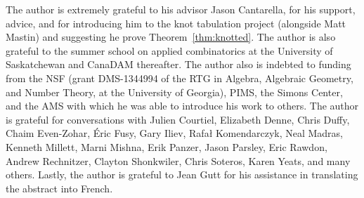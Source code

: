 \documentclass[submission%
]{dmtcs}
\begin{document}
The author is extremely grateful to his advisor Jason Cantarella, for
his support, advice, and for introducing him to the knot tabulation project
(alongside Matt Mastin) and suggesting he prove
Theorem~\ref{thm:knotted}. The author is also grateful to the summer
school on applied combinatorics at the University of Saskatchewan and
CanaDAM thereafter. The author also is indebted to funding from the NSF
(grant DMS-1344994 of the RTG in Algebra, Algebraic Geometry, and
Number Theory, at the University of Georgia), PIMS, the Simons Center,
and the AMS with which he was able to introduce his work to
others. The author is grateful for conversations with Julien Courtiel,
Elizabeth Denne, Chris Duffy, Chaim Even-Zohar, \'Eric Fusy, Gary
Iliev, Rafa\l{} Komendarczyk, Neal Madras, Kenneth Millett, Marni
Mishna, Erik Panzer, Jason Parsley, Eric Rawdon, Andrew Rechnitzer,
Clayton Shonkwiler, Chris Soteros, Karen Yeats, and many
others. Lastly, the author is grateful to Jean Gutt for his assistance
in translating the abstract into French.


%

\label{sec:biblio}
\end{document}
